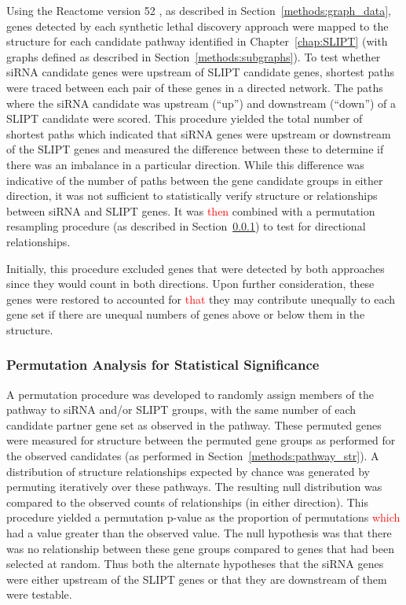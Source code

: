 Using the Reactome version 52 \citep{Reactome}, as described in Section~\ref{methods:graph_data}, genes detected by each \gls{synthetic lethal} discovery approach were mapped to the  structure for each candidate pathway identified in Chapter~\ref{chap:SLIPT} (with graphs defined as described in Section~\ref{methods:subgraphs}). To test whether \gls{siRNA} candidate genes were upstream of \gls{SLIPT} candidate genes, \glspl{shortest path} were traced between each pair of these genes in a directed network. The paths where the \gls{siRNA} candidate was upstream (``up'') and downstream (``down'') of a \gls{SLIPT} candidate were scored.  This procedure yielded the total number of \glspl{shortest path} which indicated that \gls{siRNA} genes were upstream or downstream of the \gls{SLIPT} genes and measured the difference between these to determine if there was an imbalance in a particular direction. While this difference was indicative of the number of paths between the gene candidate groups in either direction, it was not sufficient to statistically verify structure or relationships between \gls{siRNA} and \gls{SLIPT} genes. It was \textcolor{red}{then} combined with a permutation resampling procedure (as described in Section~\ref{methods:network_permutation}) to test for directional relationships.

Initially, this procedure excluded genes that were detected by both approaches since they would count in both directions. Upon further consideration, these genes were restored to accounted for \textcolor{red}{that} they may contribute unequally to each gene set if there are unequal numbers of genes above or below them in the  structure.

\subsubsection{Permutation Analysis for Statistical Significance} \label{methods:network_permutation}
A permutation procedure was developed to randomly assign members of the pathway to \gls{siRNA} and/or \gls{SLIPT} groups, with the same number of each candidate partner gene set as observed in the pathway. These permuted genes were measured for  structure between the permuted gene groups as performed for the observed candidates (as performed in Section~\ref{methods:pathway_str}). A distribution of  structure relationships expected by chance was generated by permuting iteratively over these pathways. The resulting null distribution was compared to the observed counts of relationships (in either direction). This procedure yielded a permutation p-value as the proportion of permutations \textcolor{red}{which} had a value greater than the observed value. The null hypothesis was that there was no relationship between these gene groups compared to genes that had been selected at random. Thus both the alternate hypotheses that the \gls{siRNA} genes were either upstream of the \gls{SLIPT} genes or that they are downstream of them were testable.

